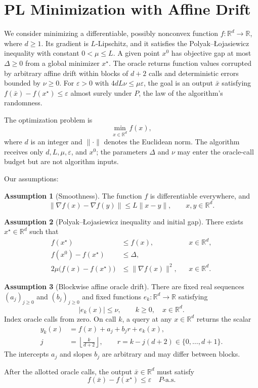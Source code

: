 \documentclass[10pt]{article}
\theoremstyle{definition}
\newtheorem{assumption}{Assumption}
\begin{document}
\section*{PL Minimization with Affine Drift}
We consider minimizing a differentiable, possibly nonconvex function $f:\mathbb{R}^d\to\mathbb{R}$, where $d\geq1$. Its gradient is $L$-Lipschitz, and it satisfies the Polyak--\L{}ojasiewicz inequality with constant $0<\mu\leq L$. A given point $x^0$ has objective gap at most $\Delta\geq0$ from a global minimizer $x^\star$. The oracle returns function values corrupted by arbitrary affine drift within blocks of $d+2$ calls and deterministic errors bounded by $\nu\geq0$. For $\varepsilon>0$ with $4dL\nu\leq\mu\varepsilon$, the goal is an output $\bar{x}$ satisfying $f(\bar{x})-f(x^\star)\leq\varepsilon$ almost surely under $P$, the law of the algorithm's randomness.

The optimization problem is
\[
\min_{x\in\mathbb{R}^d} f(x),
\]
where $d$ is an integer and $\|\cdot\|$ denotes the Euclidean norm. The algorithm receives only $d,L,\mu,\varepsilon$, and $x^0$; the parameters $\Delta$ and $\nu$ may enter the oracle-call budget but are not algorithm inputs.

Our assumptions:
\begin{assumption}[Smoothness]
The function $f$ is differentiable everywhere, and
\[
\|\nabla f(x)-\nabla f(y)\|\leq L\|x-y\|,
\qquad x,y\in\mathbb{R}^d.
\]
\end{assumption}

\begin{assumption}[Polyak--\L{}ojasiewicz inequality and initial gap]
There exists $x^\star\in\mathbb{R}^d$ such that
\[
\begin{aligned}
f(x^\star)&\leq f(x), &&x\in\mathbb{R}^d,\\
f(x^0)-f(x^\star)&\leq\Delta,\\
2\mu\bigl(f(x)-f(x^\star)\bigr)&\leq\|\nabla f(x)\|^2,
&&x\in\mathbb{R}^d.
\end{aligned}
\]
\end{assumption}

\begin{assumption}[Blockwise affine oracle drift]
There are fixed real sequences $(a_j)_{j\geq0}$ and $(b_j)_{j\geq0}$ and fixed functions $e_k:\mathbb{R}^d\to\mathbb{R}$ satisfying
\[
|e_k(x)|\leq\nu,
\qquad k\geq0,\quad x\in\mathbb{R}^d.
\]
Index oracle calls from zero. On call $k$, a query at any $x\in\mathbb{R}^d$ returns the scalar
\[
\begin{aligned}
y_k(x)&=f(x)+a_j+b_j r+e_k(x),\\
j&=\left\lfloor\frac{k}{d+2}\right\rfloor,
\qquad r=k-j(d+2)\in\{0,\ldots,d+1\}.
\end{aligned}
\]
The intercepts $a_j$ and slopes $b_j$ are arbitrary and may differ between blocks.
\end{assumption}

After the allotted oracle calls, the output $\bar{x}\in\mathbb{R}^d$ must satisfy
\[
f(\bar{x})-f(x^\star)\leq\varepsilon
\quad P\text{-a.s.}
\]
\end{document}
